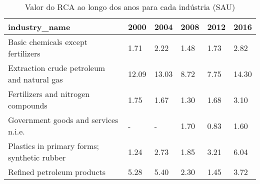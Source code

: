 \begin{table}
\centering
\caption{Valor do RCA ao longo dos anos para cada indústria (SAU)}
\begin{tabular}{p{6cm}p{1.5cm}p{1.5cm}p{1.5cm}p{1.5cm}p{1.5cm}}
\toprule
                              industry\_name &  2000 &  2004 & 2008 & 2012 &  2016 \\
\midrule
         Basic chemicals except fertilizers &  1.71 &  2.22 & 1.48 & 1.73 &  2.82 \\
 Extraction crude petroleum and natural gas & 12.09 & 13.03 & 8.72 & 7.75 & 14.30 \\
         Fertilizers and nitrogen compounds &  1.75 &  1.67 & 1.30 & 1.68 &  3.10 \\
       Government goods and services n.i.e. &     - &     - & 1.70 & 0.83 &  1.60 \\
Plastics in primary forms; synthetic rubber &  1.24 &  2.73 & 1.85 & 3.21 &  6.04 \\
                 Refined petroleum products &  5.28 &  5.40 & 2.30 & 1.45 &  3.72 \\
\bottomrule
\end{tabular}
\end{table}
